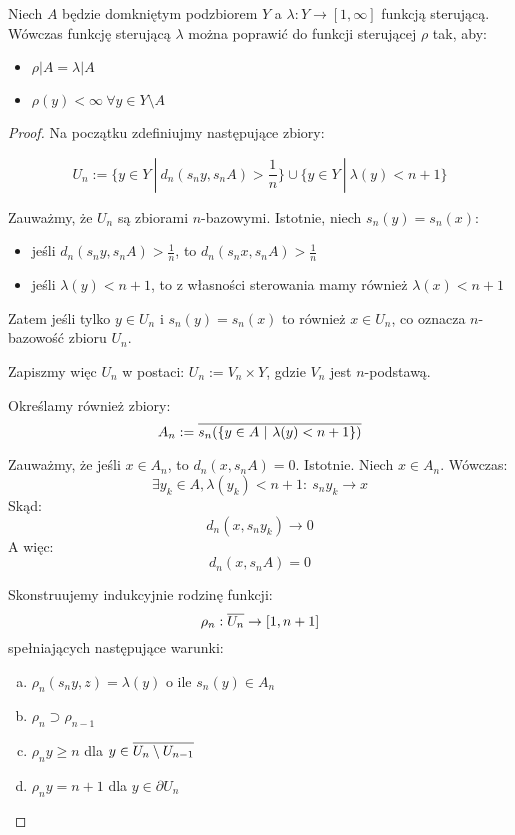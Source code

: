 \begin{thm}
Niech $A$ będzie domkniętym podzbiorem $Y$ a $\lambda: Y \rightarrow [1,\infty]$ funkcją sterującą. Wówczas funkcję sterującą $\lambda$ można poprawić do funkcji sterującej $\rho$ tak, aby:
\begin{itemize}
  \item $\rho|A = \lambda|A$
  \item $\rho(y) < \infty\ \forall y \in Y \setminus A$
\end{itemize}

\begin{proof}
  
  Na początku zdefiniujmy następujące zbiory:
  
  $$U_n := \{y \in Y\ |\ d_n(s_n y, s_n A) > \frac{1}{n}\} \cup \{y \in Y\ |\ \lambda(y) < n+1\}$$
  
  Zauważmy, że $U_n$ są zbiorami $n$-bazowymi. Istotnie, niech $s_n(y) = s_n(x)$:
  \begin{itemize}
    \item jeśli $d_n(s_n y, s_n A) > \frac{1}{n}$, to $d_n(s_n x, s_n A) > \frac{1}{n}$
    \item jeśli $\lambda(y) < n+1$, to z własności sterowania mamy również $\lambda(x) < n+1$
  \end{itemize}
  Zatem jeśli tylko $y \in U_n$ i $s_n(y) = s_n(x)$ to również $x \in U_n$, co oznacza $n$-bazowość zbioru $U_n$.
  
  Zapiszmy więc $U_n$ w postaci: $U_n := V_n \times Y$, gdzie $V_n$ jest $n$-podstawą.
  
  Określamy również zbiory:
  $$A_n := \overline{s_n({\{y \in A\ |\ \lambda(y) < n+1\}})}$$
  
  Zauważmy, że jeśli $x \in A_n$, to $d_n(x, s_n A) = 0$. Istotnie. Niech $x \in A_n$. Wówczas:
  $$\exists y_k \in A, \lambda(y_k) < n+1:\ s_n y_k \rightarrow x$$
  Skąd:
  $$d_n(x, s_n y_k) \rightarrow 0$$
  A więc:
  $$d_n(x, s_n A) = 0$$
  
  Skonstruujemy indukcyjnie rodzinę funkcji:
  $$\rho_n: \overline{U_n} \rightarrow [1, n+1]$$
  spełniających następujące warunki:
  \begin{enumerate}[(a)]
    \item \label{induction-1} $\rho_n(s_n y, z) = \lambda(y)$ o ile $s_n(y) \in A_n$
    \item \label{induction-2} $\rho_n \supset \rho_{n-1}$
    \item \label{induction-3} $\rho_n y \geq n$ dla $y \in \overline{U_n \setminus U_{n-1}}$
    \item \label{induction-4} $\rho_n y = n+1$ dla $y \in \partial U_n$
  \end{enumerate}
  

\end{proof}
\end{thm}
